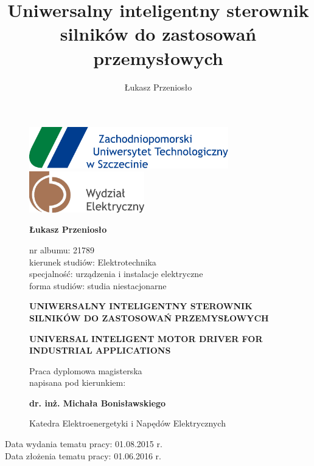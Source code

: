 \documentclass[12pt]{mwart}
\title{Uniwersalny inteligentny sterownik silników do zastosowań przemysłowych}
\author{Łukasz Przeniosło}
\numberwithin{equation}{section}
\newcommand{\paperTitlePl}{UNIWERSALNY INTELIGENTNY STEROWNIK SILNIKÓW DO ZASTOSOWAŃ PRZEMYSŁOWYCH}
\newcommand{\paperTitleEn}{UNIVERSAL INTELIGENT MOTOR DRIVER FOR INDUSTRIAL APPLICATIONS}
\newcommand{\topicChooseDate}{01.08.2015 r.}
\newcommand{\topicAcceptationDate}{01.06.2016 r.}
\begin{document}
\thispagestyle{empty} %

\begin{figure}[h]
	\centering
	\includegraphics[height=18mm]{grafiki/logo_zut.pdf}
	\hspace{5mm}
	\includegraphics[height=18mm]{grafiki/logo_zut_we.pdf} \\
	\vspace{20mm}


	{\bf \large Łukasz Przeniosło} \\ 
	\vspace{5mm}

	nr albumu: 21789 \\
	kierunek studiów: Elektrotechnika \\
	specjalność: urządzenia i instalacje elektryczne \\
	forma studiów: studia niestacjonarne \\
	\vspace{20mm}

	\textsc{\textbf{\large \paperTitlePl}} \\
	\vspace{5mm}

	{\bf \large \paperTitleEn} \\
	\vspace{45mm}
	
	Praca dyplomowa magisterska \\
	napisana pod kierunkiem: \\
	\vspace{2mm}
	
	{\bf \large dr. inż. Michała Bonisławskiego} \\
	\vspace{2mm}
	
	Katedra Elektroenergetyki i Napędów Elektrycznych
	\vspace{5mm}
	
\end{figure}

\begin{flushleft}
	{\footnotesize Data wydania tematu pracy: \topicChooseDate} \\
	{\footnotesize Data złożenia tematu pracy: \topicAcceptationDate} 
\end{flushleft}
\end{document}
